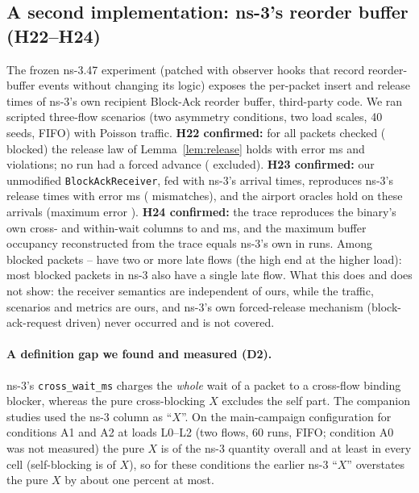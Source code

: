 \documentclass[11pt]{article}
\theoremstyle{definition}
\begin{document}
\subsection{A second implementation: ns-3's reorder buffer (H22--H24)}\label{sec:val-ns3}
The frozen ns-3.47 experiment (patched with observer hooks that record reorder-buffer events without changing its logic) exposes the per-packet insert and release times of ns-3's own recipient Block-Ack reorder buffer, third-party code. We ran \FvNsSixRuns{} scripted three-flow scenarios (two asymmetry conditions, two load scales, 40 seeds, FIFO) with Poisson traffic. \textbf{H22 confirmed:} for all \FvNsSixPackets{} packets checked (\FvNsSixBlocked{} blocked) the release law of Lemma~\ref{lem:release} holds with error \FvNsSixErr{} ms and \FvNsSixViol{} violations; no run had a forced advance (\FvNsSixExcl{} excluded). \textbf{H23 confirmed:} our unmodified \texttt{BlockAckReceiver}, fed with ns-3's arrival times, reproduces ns-3's release times with error \FvNsSixPy{} ms (\FvNsSixPyMis{} mismatches), and the airport oracles hold on these arrivals (maximum error \FvNsSixOr{}). \textbf{H24 confirmed:} the trace reproduces the binary's own cross- and within-wait columns to \FvNsSixHc{} and \FvNsSixHw{} ms, and the maximum buffer occupancy reconstructed from the trace equals ns-3's own in \FvNsSixOcc{} runs. Among blocked packets \FvNsSixMultiMin{}--\FvNsSixMultiMax{} have two or more late flows (the high end at the higher load): most blocked packets in ns-3 also have a single late flow. What this does and does not show: the receiver semantics are independent of ours, while the traffic, scenarios and metrics are ours, and ns-3's own forced-release mechanism (block-ack-request driven) never occurred and is not covered.

\paragraph{A definition gap we found and measured (D2).}
ns-3's \texttt{cross\_wait\_ms} charges the \emph{whole} wait of a packet to a cross-flow binding blocker, whereas the pure cross-blocking $X$ excludes the self part. The companion studies used the ns-3 column as ``$X$''. On the main-campaign configuration for conditions A1 and A2 at loads L0--L2 (two flows, 60 runs, FIFO; condition A0 was not measured) the pure $X$ is \FvDtwoRatioAll{} of the ns-3 quantity overall and at least \FvDtwoRatioMin{} in every cell (self-blocking is \FvDtwoSX{} of $X$), so for these conditions the earlier ns-3 ``$X$'' overstates the pure $X$ by about one percent at most.
\begin{table}[h]
\centering\small

\caption{D2 (descriptive): pure cross-blocking $X$, self-blocking $S$ and ns-3's cross wait for the latency-sensitive flow, main-campaign configuration, 10 seeds per cell.}
\end{table}
\end{document}
